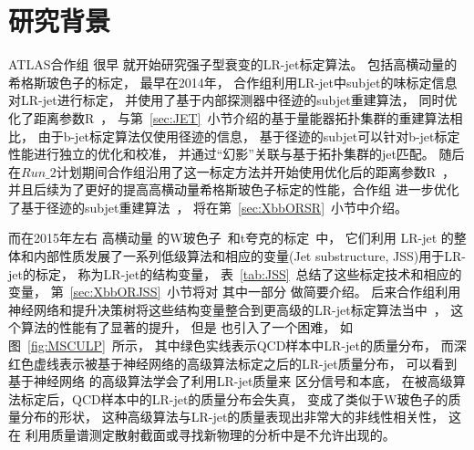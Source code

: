 \section{研究背景}
\label{sec:XbbBKG}


ATLAS合作组
很早
就开始研究强子型衰变的LR-jet标定算法。
包括高横动量的希格斯玻色子的标定，
最早在2014年，
合作组利用LR-jet中subjet的味标定信息对LR-jet进行标定，
并使用了基于内部探测器中径迹的subjet重建算法，
同时优化了距离参数R~\cite{TAGGING1}，
与第~\ref{sec:JET}~小节介绍的基于量能器拓扑集群的重建算法相比，
由于b-jet标定算法仅使用径迹的信息，
基于径迹的subjet可以针对b-jet标定性能进行独立的优化和校准，
并通过“幻影”关联与基于拓扑集群的jet匹配。
随后在$Run\_2$计划期间合作组沿用了这一标定方法并开始使用优化后的距离参数R~\cite{TAGGING5}，
并且后续为了更好的提高高横动量希格斯玻色子标定的性能，合作组
进一步优化了基于径迹的subjet重建算法~\cite{ATL-PHYS-PUB-2017-010}，
将在第~\ref{sec:XbbORSR}~小节中介绍。

而在2015年左右
高横动量
的W玻色子~\cite{TAGGING3}和t夸克的标定~\cite{TAGGING2}中，
它们利用
LR-jet
的整体和内部性质发展了一系列低级算法和相应的变量(Jet substructure, JSS)用于LR-jet的标定，
称为LR-jet的结构变量，
表~\ref{tab:JSS}~总结了这些标定技术和相应的变量，
第~\ref{sec:XbbORJSS}~小节将对
其中一部分
做简要介绍。
后来合作组利用神经网络和提升决策树将这些结构变量整合到更高级的LR-jet标定算法当中~\cite{ATL-PHYS-PUB-2017-004}，
这个算法的性能有了显著的提升，
但是
也引入了一个困难，
如图~\ref{fig:MSCULP}~所示，
其中绿色实线表示QCD样本中LR-jet的质量分布，
而深红色虚线表示被基于神经网络的高级算法标定之后的LR-jet质量分布，
可以看到基于神经网络
的高级算法学会了利用LR-jet质量来%
区分信号和本底，
在被高级算法标定后，QCD样本中的LR-jet的质量分布会失真，
变成了类似于W玻色子的质量分布的形状，
这种高级算法与LR-jet的质量表现出非常大的非线性相关性，
这在%
利用质量谱测定散射截面或寻找新物理的分析中是不允许出现的。

